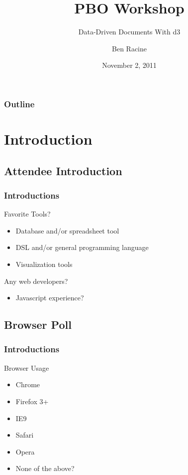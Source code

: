 \documentclass{beamer}
\title{PBO Workshop}
\subtitle{Data-Driven Documents With d3}
\author{Ben Racine \inst{1} }
\institute{\inst{1} Cornerstone Systems NW }
\date{November 2, 2011}
\begin{document}
\begin{frame}
    \frametitle{}
    \titlepage
\end{frame}


\begin{frame}
    \frametitle{Outline}
    \tableofcontents
\end{frame}


\section{Introduction}

\subsection{Attendee Introduction}

\begin{frame}
    \frametitle{Introductions}
    \begin{block}{Favorite Tools?}
        \pause
        \begin{itemize}
        \item Database and/or spreadsheet tool
        \item DSL and/or general programming language
        \item Visualization tools
        \end{itemize}
    \end{block}
    \pause
    \begin{block}{Any web developers?}
        \begin{itemize}
        \item Javascript experience?
        \end{itemize}
    \end{block}
\end{frame}


\subsection{Browser Poll}

\begin{frame}
    \frametitle{Introductions}
    \begin{block}{Browser Usage}
        \begin{itemize}
        \item Chrome
        \pause
        \item Firefox 3+
        \pause
        \item IE9
        \pause
        \item Safari
        \pause
        \item Opera
        \pause
        \item None of the above?
        \end{itemize}
    \end{block}
\end{frame}
\end{document}
